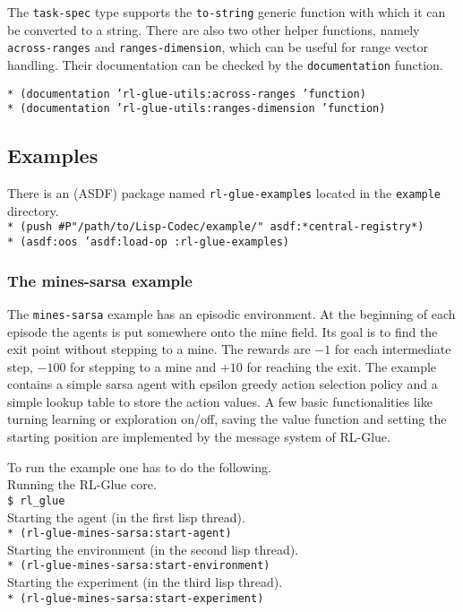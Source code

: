\documentclass[11pt,a4paper,dvipdfm]{article}
\newcommand{\prompttext}[1]{\texttt{#1}}
\newcommand{\shprompt}[1]{\prompttext{\$ #1}}
\newcommand{\lispprompt}[1]{\prompttext{* #1}}
\begin{document}
The \prompttext{task-spec} type supports the \prompttext{to-string} generic
function with which it can be converted to a string. There are also two other
helper functions, namely \prompttext{across-ranges} and
\prompttext{ranges-dimension}, which can be useful for range vector handling.
Their documentation can be checked by the \prompttext{documentation} function.

\lispprompt{(documentation 'rl-glue-utils:across-ranges 'function)} \\
\lispprompt{(documentation 'rl-glue-utils:ranges-dimension 'function)}

\hypertarget{examples}{\subsection{Examples}}

There is an (ASDF) package named \prompttext{rl-glue-examples} located
in the \prompttext{example} directory. \\
\lispprompt{(push \#P"/path/to/Lisp-Codec/example/" asdf:*central-registry*)} \\
\lispprompt{(asdf:oos 'asdf:load-op :rl-glue-examples)}

\subsubsection{The mines-sarsa example}

The \prompttext{mines-sarsa} example has an episodic environment. At the
beginning of each episode the agents is put somewhere onto the mine field.
Its goal is to find the exit point without stepping to a mine. The rewards
are $-1$ for each intermediate step, $-100$ for stepping to a mine and $+10$
for reaching the exit. The example contains a simple sarsa agent with epsilon
greedy action selection policy and a simple lookup table to store the action
values. A few basic functionalities like turning learning or exploration on/off,
saving the value function and setting the starting position are implemented by
the message system of RL-Glue.

To run the example one has to do the following. \\
Running the RL-Glue core. \\
\shprompt{rl\_glue} \\
Starting the agent (in the first lisp thread). \\
\lispprompt{(rl-glue-mines-sarsa:start-agent)} \\
Starting the environment (in the second lisp thread). \\
\lispprompt{(rl-glue-mines-sarsa:start-environment)} \\
Starting the experiment (in the third lisp thread). \\
\lispprompt{(rl-glue-mines-sarsa:start-experiment)}
\end{document}
